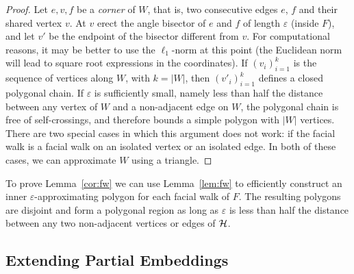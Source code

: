 \documentclass{llncs}
\newcommand{\remove}[1]{}
\begin{document}
\begin{proof}
 Let $e,v,f$ be a {\em corner} of $W$, that is, two consecutive edges $e$, $f$ and their shared vertex $v$. At $v$ erect the angle bisector of $e$ and $f$ of length $\varepsilon$ (inside $F$), and let $v'$ be the endpoint of the bisector different from $v$. For computational reasons, it may be better to use the $\ell_1$-norm at this point (the Euclidean norm will lead to square root expressions in the coordinates). If $(v_i)_{i = 1}^k$ is the sequence of vertices along $W$, with $k = |W|$, then $(v'_i)_{i = 1}^k$ defines a
 closed polygonal chain.  If $\varepsilon$ is sufficiently small, namely less than half the distance between any vertex of $W$ and a non-adjacent edge on $W$, the
 polygonal chain
is free of self-crossings, and therefore bounds a simple polygon with $|W|$ vertices. There are two special cases in which this argument does not work: if the facial walk is a facial walk on an isolated vertex or an isolated edge. In both of these cases, we can approximate $W$ using a
 triangle.
\end{proof}

To prove Lemma~\ref{cor:fw} we can use
Lemma~\ref{lem:fw} to efficiently construct an inner $\varepsilon$-approximating polygon for
each facial walk of $F$.
The resulting polygons are disjoint and form a polygonal region
as long as $\varepsilon$ is less than half the distance between any two non-adjacent vertices or edges of $\cal H$.


\remove{
Lemma~\ref{lem:fw} allows us to replace a facial boundary with a
{\em polygonal region},
that is, a collection of
simple polygons that bound a face which is very close to the original boundary, has bounded complexity, and can be constructed efficiently. This leads to a proof of Lemma~\ref{cor:fw}. Namely, approximate each facial walk of the facial boundary with an $\varepsilon$-close
polygon lying in $F$. The
result is a polygonal region
as long as $\varepsilon$ is less than half the distance between any two non-adjacent vertices or edges. The upper bound of $3k$ will generally be a large overestimate, but allows for the possibility that all the inner walks are walks on isolated vertices. If there are no isolated vertices, then a walk of size $k$ gets replaced by a polygon of size at most $3k/2$ (a tight bound for $k=2$), proving the slightly sharper upper bound.
}

\subsection{Extending Partial Embeddings}\label{sec:EPP}
\end{document}
